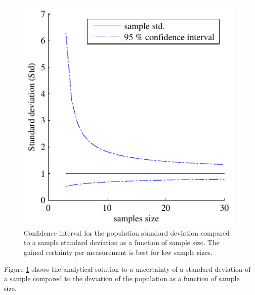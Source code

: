 \documentclass[aip,amsmath, reprint, author-year,nobalancelastpage]{revtex4-1}
\begin{document}
\begin{figure}[H]
\includegraphics{stats_std_confidence.pdf}
\caption{\label{fig:std_uncertainty}Confidence interval for the population standard deviation compared to a sample standard deviation as a function of sample size. The gained certainty per measurement is best for low sample sizes.}
\end{figure}

Figure \ref{fig:std_uncertainty} shows the analytical solution to a uncertainty of a standard deviation of a sample compared to the deviation of the population as a function of sample size. 

\newpage
\end{document}
